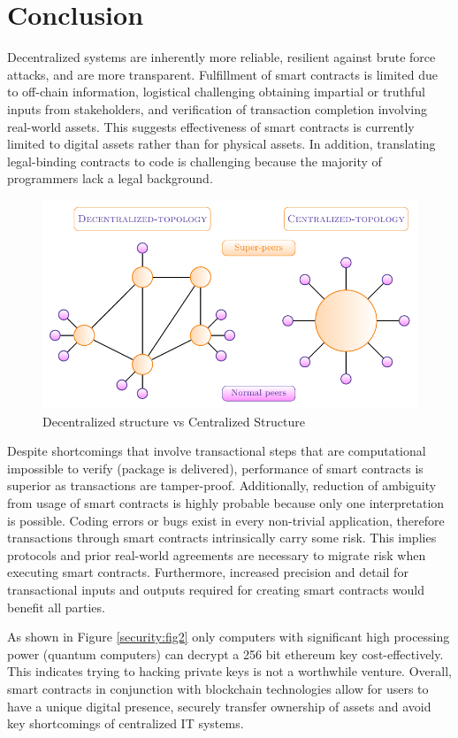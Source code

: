\section{Conclusion}

Decentralized systems are inherently more reliable, resilient against brute force attacks, and are more transparent. Fulfillment of smart contracts is limited due to off-chain information, logistical challenging obtaining impartial or truthful inputs from stakeholders, and verification of transaction completion involving real-world assets. This suggests effectiveness of smart contracts is currently limited to digital assets rather than for physical assets.  In addition, translating legal-binding contracts to code is challenging because the majority of programmers lack a legal background.

\begin{figure}[H]
\centering
\includegraphics[width=0.5\linewidth]{Diagrams/DappVApp}
\caption{Decentralized structure vs Centralized Structure}
\label{fig:dappvapp}
\end{figure}

Despite shortcomings that involve transactional steps that are computational impossible to verify (package is delivered), performance of smart contracts is superior as transactions are tamper-proof.
Additionally, reduction of ambiguity from usage of smart contracts is highly probable because only one interpretation is possible. Coding errors or bugs exist in every non-trivial application, therefore transactions through smart contracts intrinsically carry some risk. This implies protocols and prior real-world agreements are necessary to migrate risk when executing smart contracts. Furthermore, increased precision and detail for transactional inputs and outputs required for creating smart contracts would benefit all parties. 

As shown in Figure \ref{security:fig2} only computers with significant high processing power  (quantum computers) can decrypt a 256 bit ethereum key cost-effectively. This indicates trying to hacking private keys is not a worthwhile venture.
Overall, smart contracts in conjunction with blockchain technologies allow for users to have a unique digital presence, securely transfer ownership of assets and avoid key shortcomings of centralized IT systems.

